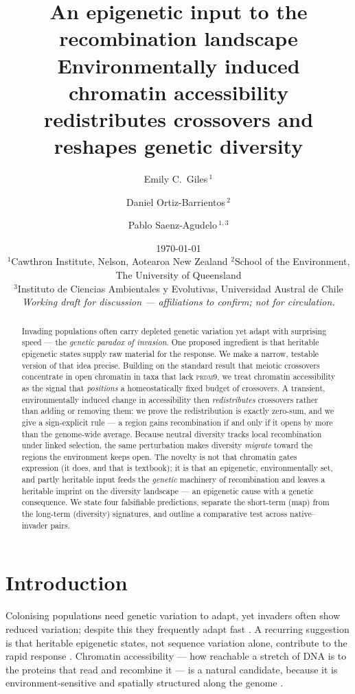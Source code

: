 \documentclass[11pt]{article}
\title{\bfseries An epigenetic input to the recombination landscape\\[6pt]
{\large\normalfont Environmentally induced chromatin accessibility redistributes
crossovers and reshapes genetic diversity}}
\author{
Emily C.\ Giles\,$^{1}$ \and
Daniel Ortiz-Barrientos\,$^{2}$ \and
Pablo Saenz-Agudelo\,$^{1,3}$
}
\date{\today \\[4pt]
\small $^{1}$Cawthron Institute, Nelson, Aotearoa New Zealand \quad
$^{2}$School of the Environment, The University of Queensland \\
\small $^{3}$Instituto de Ciencias Ambientales y Evolutivas, Universidad Austral de Chile \\[2pt]
\small \textit{Working draft for discussion — affiliations to confirm; not for circulation.}}
\theoremstyle{remark}
\begin{document}
\maketitle

\begin{abstract}
\noindent
Invading populations often carry depleted genetic variation yet adapt with
surprising speed --- the \emph{genetic paradox of invasion}. One proposed
ingredient is that heritable epigenetic states supply raw material for the
response. We make a narrow, testable version of that idea precise. Building on
the standard result that meiotic crossovers concentrate in open chromatin in
taxa that lack \textsc{prdm9}, we treat chromatin accessibility as the signal
that \emph{positions} a homeostatically fixed budget of crossovers. A transient,
environmentally induced change in accessibility then \emph{redistributes}
crossovers rather than adding or removing them: we prove the redistribution is
exactly zero-sum, and we give a sign-explicit rule --- a region gains
recombination if and only if it opens by more than the genome-wide average.
Because neutral diversity tracks local recombination under linked selection, the
same perturbation makes diversity \emph{migrate} toward the regions the
environment keeps open. The novelty is not that chromatin gates expression (it
does, and that is textbook); it is that an epigenetic, environmentally set, and
partly heritable input feeds the \emph{genetic} machinery of recombination and
leaves a heritable imprint on the diversity landscape --- an epigenetic cause
with a genetic consequence. We state four falsifiable predictions, separate the
short-term (map) from the long-term (diversity) signatures, and outline a
comparative test across native--invader pairs.
\end{abstract}

\section{Introduction}

Colonising populations need genetic variation to adapt, yet invaders often show
reduced variation; despite this they frequently adapt fast
\citep{sakai2001,perez2006,simberloff2011}. A recurring suggestion is that
heritable epigenetic states, not sequence variation alone, contribute to the
rapid response \citep{nota2023}. Chromatin accessibility --- how reachable a
stretch of DNA is to the proteins that read and recombine it --- is a natural
candidate, because it is environment-sensitive and spatially structured along
the genome \citep{klemm2019}.
\end{document}
